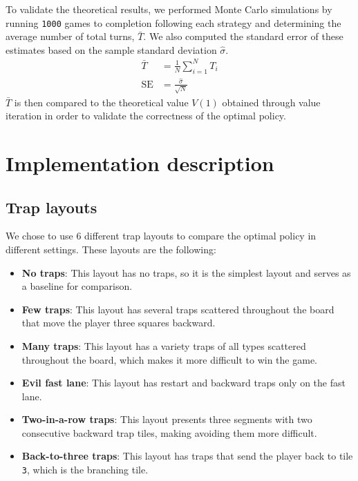 \documentclass[12pt, twocolumn]{article}
\begin{document}
\noindent To validate the theoretical results, we performed Monte Carlo simulations by running \texttt{1000} games to completion following each strategy and determining the average number of total turns, $\bar{T}$. We also computed the standard error of these estimates based on the sample standard deviation $\hat{\sigma}$.
\begin{equation*}
    \begin{split}
        \bar{T} &= \frac{1}{N} \sum_{i=1}^{N} T_i \\
        \mathrm{SE} &= \frac{\hat{\sigma}}{\sqrt{N}}
    \end{split}
\end{equation*}
$\bar{T}$ is then compared to the theoretical value $V(1)$ obtained through value iteration in order to validate the correctness of the optimal policy.

\section*{Implementation description}

\subsection*{Trap layouts}

We chose to use 6 different trap layouts to compare the optimal policy in different settings. These layouts are the following:
\begin{itemize}
    \item \textbf{No traps}: This layout has no traps, so it is the simplest layout and serves as a baseline for comparison.
    \item \textbf{Few traps}: This layout has several traps scattered throughout the board that move the player three squares backward.
    \item \textbf{Many traps}: This layout has a variety traps of all types scattered throughout the board, which makes it more difficult to win the game.
    \item \textbf{Evil fast lane}: This layout has restart and backward traps only on the fast lane.
    \item \textbf{Two-in-a-row traps}: This layout presents three segments with two consecutive backward trap tiles, making avoiding them more difficult.
    \item \textbf{Back-to-three traps}: This layout has traps that send the player back to tile \texttt{3}, which is the branching tile.

\end{itemize}
\end{document}
